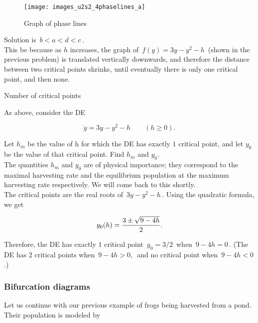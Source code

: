 \begin{figure}[ht!]
  \centering
  \texttt{[image: images\_u2s2\_4phaselines\_a]}
  \caption{Graph of phase lines}
\end{figure}

Solution is $\, b < a < d < c \,$.\\
This be because as $h$ increases, the graph of $\, f(y) = 3y − y^2 − h\,$
(shown in the previous problem) is translated vertically downwards,
and therefore the distance between two critical points shrinks,
until eventually there is only one critical point, and then none.

\begin{exercise}
  Number of critical points
\end{exercise}

As above, consider the DE

\begin{equation*}
  \dot y = 3y - y^2 - h \qquad (h \geq 0). 
\end{equation*}

Let $h_m$ be the value of h for which the DE has exactly $1$ critical point,
and let $y_0$ be the value of that critical point. Find $h_m$ and $y_0$. \\
The quantities $h_m$ and $y_0$ are of physical importance;
they correspond to the maximal harvesting rate
and the equilibrium population at the maximum harvesting rate respectively.
We will come back to this shortly.\\

The critical points are the real roots of $\, 3y − y^2 − h\,$.
Using the quadratic formula, we get

\begin{equation*}
  \displaystyle \displaystyle y_0(h) = \frac{3 \pm \sqrt{9 - 4h}}{2}. 
\end{equation*}

Therefore, the DE has exactly $1$ critical point $\, y_0 = 3/2\,$ when $\, 9 − 4h = 0\,$.
(The DE has $2$ critical points when $\, 9 − 4h > 0,\,$
and no critical point when $\, 9 − 4h < 0\,$.)

\clearpage

\subsubsection{Bifurcation diagrams}

Let us continue with our previous example of frogs being harvested from a pond.
Their population is modeled by

